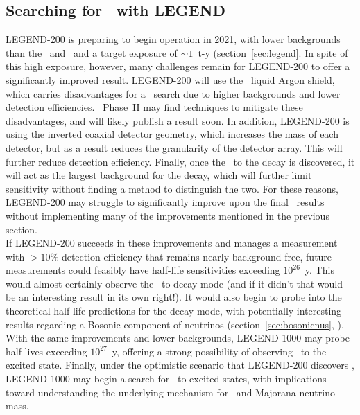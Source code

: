 \documentclass[/main.tex]{subfiles}
\begin{document}
\subsection{Searching for \bbes\ with LEGEND}
LEGEND-200 is preparing to begin operation in 2021, with lower backgrounds than the \MJD\ and \Gerda\ and a target exposure of $\sim1$~t-y (section~\ref{sec:legend}.
In spite of this high exposure, however, many challenges remain for LEGEND-200 to offer a significantly improved result.
LEGEND-200 will use the \Gerda\ liquid Argon shield, which carries disadvantages for a \bbes\ search due to higher backgrounds and lower detection efficiencies.
\Gerda\ Phase~II may find techniques to mitigate these disadvantages, and will likely publish a result soon.
In addition, LEGEND-200 is using the inverted coaxial detector geometry, which increases the mass of each detector, but as a result reduces the granularity of the detector array.
This will further reduce detection efficiency.
Finally, once the \bbes\ to the  decay is discovered, it will act as the largest background for the  decay, which will further limit sensitivity without finding a method to distinguish the two.
For these reasons, LEGEND-200 may struggle to significantly improve upon the final \MJD\ results without implementing many of the improvements mentioned in the previous section.
\\
If LEGEND-200 succeeds in these improvements and manages a measurement with $>10\%$ detection efficiency that remains nearly background free, future measurements could feasibly have half-life sensitivities exceeding $10^{26}$~y.
This would almost certainly observe the \bbes\ to  decay mode (and if it didn't that would be an interesting result in its own right!).
It would also begin to probe into the theoretical half-life predictions for the  decay mode, with potentially interesting results regarding a Bosonic component of neutrinos (section~\ref{sec:bosonicnus}, \cite{Tornow2010}).
With the same improvements and lower backgrounds, LEGEND-1000 may probe half-lives exceeding $10^{27}$~y, offering a strong possibility of observing \tnbb\ to the  excited state.
Finally, under the optimistic scenario that LEGEND-200 discovers \znbb, LEGEND-1000 may begin a search for \znbb\ to excited states, with implications toward understanding the underlying mechanism for \znbb\ and Majorana neutrino mass.
\\
\onlyinsubfile{
  
  
}
\end{document}
